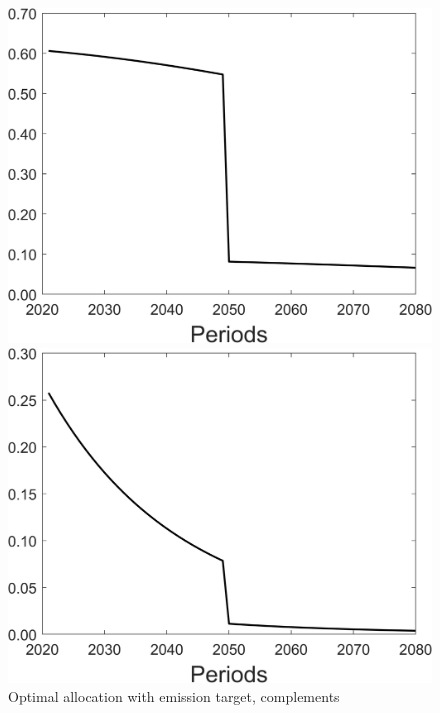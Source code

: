 \begin{figure}[h!!]
	\centering
	\caption{Optimal allocation with emission target, complements }\label{fig:optallo_comp_onlyR}
	\begin{minipage}[]{0.32\textwidth}
		\includegraphics[width=1\textwidth]{../../codding_model/Own/figures/Rep_agent/staticonlyRam_separate_c_periods59_eppsilon0.40_zeta1.40_Ad08_Ac04_thetac0.70_thetad0.56_HetGrowth1_tauul0.181_util0_withtarget1_lgd0.png}
	\end{minipage}
	\begin{minipage}[]{0.32\textwidth}
		\includegraphics[width=1\textwidth]{../../codding_model/Own/figures/Rep_agent/staticonlyRam_separate_hh_periods59_eppsilon0.40_zeta1.40_Ad08_Ac04_thetac0.70_thetad0.56_HetGrowth1_tauul0.181_util0_withtarget1_lgd0.png}

\end{minipage}
\end{figure}
